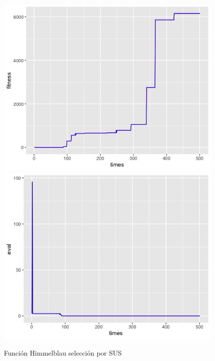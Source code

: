 \documentclass[letterpaper,12pt]{article}
\theoremstyle{definition}
\begin{document}
\begin{figure}[H]
    \includegraphics[width=\linewidth]{him_elite_sus_fitness_new}
  \endminipage\hfill
    \includegraphics[width=\linewidth]{him_elite_sus_eval_new}
  \endminipage\hfill
  \caption{Función Himmelblau selección por SUS}
  \label{fig:him_sus}
\end{figure}
\end{document}
